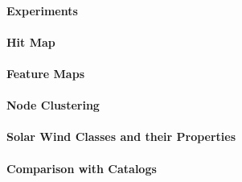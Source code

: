 \paragraph{Experiments}

\paragraph{Hit Map}

\paragraph{Feature Maps}

\paragraph{Node Clustering}

\paragraph{Solar Wind Classes and their Properties}

\paragraph{Comparison with Catalogs}
